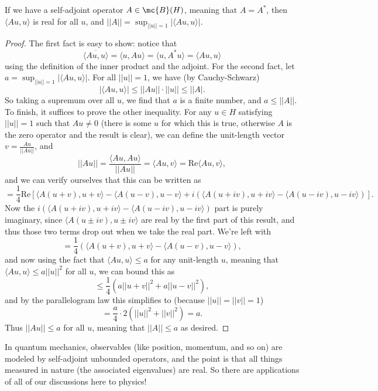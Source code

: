 \begin{theorem}
If we have a self-adjoint operator $A \in \mc{B}(H)$, meaning that $A = A^\ast$, then $\langle Au, u \rangle$ is real for all $u$, and $||A|| = \sup_{||u|| = 1} |\langle Au, u \rangle|$.
\end{theorem}
\begin{proof}
The first fact is easy to show: notice that
\[
    \overline{\langle Au, u \rangle} = \langle u, Au \rangle = \langle u, A^\ast u \rangle = \langle Au, u \rangle
\]
using the definition of the inner product and the adjoint. For the second fact, let $a = \sup_{||u|| = 1} |\langle Au, u \rangle|$. For all $||u|| = 1$, we have (by Cauchy-Schwarz)
\[
    |\langle Au, u \rangle| \le ||Au|| \cdot ||u|| \le ||A|.
\]
So taking a supremum over all $u$, we find that $a$ is a finite number, and $a \le ||A||$. To finish, it suffices to prove the other inequality. For any $u \in H$ satisfying $||u|| = 1$ such that $Au \ne 0$ (there is some $u$ for which this is true, otherwise $A$ is the zero operator and the result is clear), we can define the unit-length vector $v = \frac{Au}{||Au||}$, and 
\[
    ||Au|| = \frac{\langle Au, Au \rangle}{||Au||} = \langle Au, v \rangle = \text{Re}\langle Au, v \rangle, 
\]
and we can verify ourselves that this can be written as 
\[
    = \frac{1}{4} \text{Re}\left[ \langle A(u+v), u+v \rangle - \langle A(u-v), u-v\rangle + i\left(\langle A(u+iv), u+iv \rangle - \langle A(u-iv), u-iv \rangle\right)\right].
\]
Now the $i\left(\langle A(u+iv), u+iv \rangle - \langle A(u-iv), u-iv \rangle\right)$ part is purely imaginary, since $\langle A(u\pm iv), u\pm iv \rangle$ are real by the first part of this result, and thus those two terms drop out when we take the real part. We're left with 
\[
    = \frac{1}{4} \left(\langle A(u+v), u+v \rangle - \langle A(u-v), u-v \rangle \right),
\]
and now using the fact that $\langle Au, u \rangle \le a$ for any unit-length $u$, meaning that $\langle Au, u \rangle \le a ||u||^2$ for all $u$, we can bound this as
\[
    \le \frac{1}{4} (a||u+v||^2 + a||u-v||^2),
\]
and by the parallelogram law this simplifies to (because $||u|| = ||v|| = 1$)
\[
    = \frac{a}{4} \cdot 2 (||u||^2 + ||v||^2) = a.
\]
Thus $||Au|| \le a$ for all $u$, meaning that $||A|| \le a$ as desired.
\end{proof}

\begin{remark}
In quantum mechanics, observables (like position, momentum, and so on) are modeled by self-adjoint unbounded operators, and the point is that all things measured in nature (the associated eigenvalues) are real. So there are applications of all of our discussions here to physics!
\end{remark}

